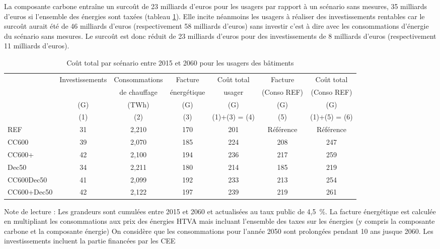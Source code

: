 \documentclass[10.5pt,a4paper]{article}
\def\euro{\mbox{\raisebox{.25ex}{{\it =}}\hspace{-.5em}{\sf C}}}
\begin{document}
{%

La composante carbone entraîne un surcoût de 23 milliards d'euros pour les usagers par rapport à un scénario sans mesures, 35 milliards d'euros si l'ensemble des énergies sont taxées (tableau \ref{Bilan_usager_CC}). Elle incite néanmoins les usagers à réaliser des investissements rentables car le surcoût aurait été de 46 milliards d'euros (respectivement 58 milliards d'euros) sans investir c'est à dire avec les consommations d'énergie du scénario sans mesures. Le surcoût est donc réduit de 23 milliards d'euros pour des investissements de 8 milliards d'euros (respectivement 11 milliards d'euros).
	
	\begin{table}[h] \caption{Coût total par scénario entre 2015 et 2060 pour les usagers des bâtiments}\label{Bilan_usager_CC}
\begin{center}
\scriptsize
\begin{tabular}[c]{|l|c|c|c|c|c|c|}
\hline
					& Investissements &  Consommations 		&	Facture  		 & Coût total & Facture 		& Coût total  \\
					&									& 	de chauffage		& énergétique & 	 usager		& (Conso REF)	&	(Conso REF) \\
					&		(G\euro)		&			(TWh)				&		(G\euro) 					& (G\euro)	 	& (G\euro) 					& (G\euro) \\
					&    (1) 				&      (2)        &      (3)            & (1)+(3) = (4) &  (5) & (1)+(5) = (6) \\
\hline
REF 					&	31 &2,210 &170 &201 & Référence & Référence\\
CC600 				&	39 &2,070 &185 &224 &208 &247 \\
CC600+ 				&	42 &2,100 &194 &236 &217 &259 \\
Dec50 				&	34 &2,211 &180 &214 &185 &219 \\
CC600Dec50 		&	41 &2,099 &192 &233 &213 &254 \\
CC600+Dec50		&	42 &2,122 &197 &239 &219 &261 \\
\hline
\end{tabular}
\end{center}
	\footnotesize{Note de lecture : Les grandeurs sont cumulées entre 2015 et 2060 et actualisées au taux public de 4,5~\%.  La facture énergétique est calculée en multipliant les consommations aux prix des énergies HTVA mais incluant l'ensemble des taxes sur les énergies (y compris la composante carbone et la composante énergie)  On considère que les consommations pour l'année 2050 sont prolongées pendant 10 ans jusque 2060. Les investissements incluent la partie financées par les CEE}
\end{table}

}
\end{document}
